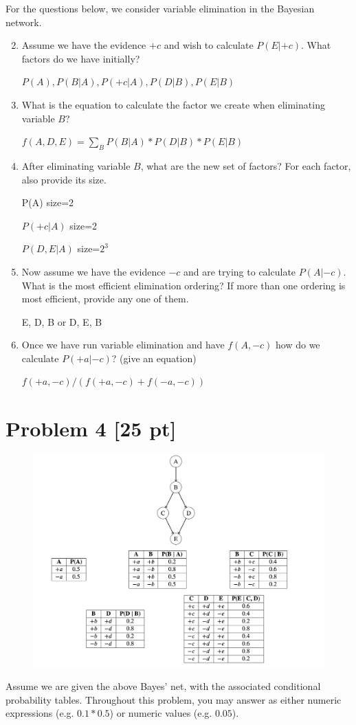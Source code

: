 \documentclass[12pt]{article}
\theoremstyle{case}
\begin{document}
For the questions below, we consider variable elimination in the Bayesian network.

\begin{enumerate} [label=(\alph*)]\setcounter{enumi}{1}
\item Assume we have the evidence $+c$ and wish to calculate $P(E|+c)$. What factors do we have initially?

$P(A), P(B | A), P(+c | A), P(D | B), P(E | B)$

\item What is the equation to calculate the factor we create when eliminating variable $B$?

$f(A, D, E) = \sum_{B} P(B | A) * P(D | B) * P(E | B)$

\item After eliminating variable $B$, what are the new set of factors? For each factor, also provide its size.

P(A) size=2

$P(+c|A)$ size=2

$P(D, E | A)$ size=$2^{3}$

\item Now assume we have the evidence $-c$ and are trying to calculate $P(A|-c)$. What is the most efficient elimination ordering? If more than one ordering is most efficient, provide any one of them. 

E, D, B or D, E, B

\item Once we have run variable elimination and have $f(A, -c)$ how do we calculate $P(+a|-c)$? (give an equation)

$f(+a,-c)/(f(+a,-c)+f(-a,-c))$

\end{enumerate}

\newpage
\section*{Problem 4 [25 pt]}
\begin{figure}[h]
\includegraphics[width=.97\textwidth]{assignment4_4.png}
\centering
\end{figure}
Assume we are given the above Bayes’ net, with the associated conditional probability tables. Throughout this problem, you may answer as either numeric expressions (e.g. $0.1 * 0.5$) or numeric values (e.g. $0.05$).
\end{document}
